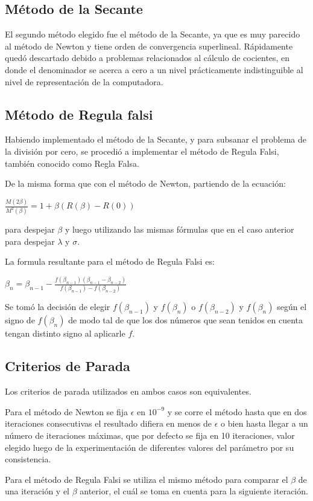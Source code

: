 \subsection{M\'etodo de la Secante}

El segundo m\'etodo elegido fue el m\'etodo de la Secante, ya que es muy parecido al m\'etodo de Newton y tiene orden 
de convergencia superlineal. R\'apidamente qued\'o descartado debido a problemas relacionados al c\'alculo de 
cocientes, en donde el denominador se acerca a cero a un nivel pr\'acticamente indistinguible al nivel de 
representaci\'on de la computadora.

\subsection{M\'etodo de Regula falsi}

Habiendo implementado el m\'etodo de la Secante, y para subsanar el problema de la divisi\'on por cero, se 
procedi\'o a implementar el m\'etodo de Regula Falsi, tambi\'en conocido como Regla Falsa.

De la misma forma que con el m\'etodo de Newton, partiendo de la ecuaci\'on:

$\frac{M(2\beta)}{M^2(\beta)}=1 + \beta(R(\beta)-R(0))$

para despejar $\beta$ y luego utilizando las mismas f\'ormulas que en el caso anterior para despejar $\lambda$ y 
$\sigma$.

La formula resultante para el m\'etodo de Regula Falsi es:

$\beta_n = \beta_{n-1} - \frac{f(\beta_{n-1}) (\beta_{n-1}-\beta_{n-2})}{f(\beta_{n-1}) - f(\beta_{n-2})}$

Se tom\'o la decisi\'on de elegir $f(\beta_{n-1})$ y $f(\beta_n)$ o $f(\beta_{n-2})$ y $f(\beta_n)$ seg\'un el 
signo de $f(\beta_n)$ de modo tal de que los dos n\'umeros que sean tenidos en cuenta tengan distinto signo al 
aplicarle $f$.

\subsection{Criterios de Parada}

Los criterios de parada utilizados en ambos casos son equivalentes.

Para el m\'etodo de Newton se fija $\epsilon$ en $10^{-9}$ y se corre el m\'etodo hasta que en dos iteraciones 
consecutivas el resultado difiera en menos de $\epsilon$ o bien hasta llegar a un n\'umero de iteraciones m\'aximas, 
que por defecto se fija en 10 iteraciones, valor elegido luego de la experimentaci\'on de diferentes valores del 
par\'ametro por su consistencia.

Para el m\'etodo de Regula Falsi se utiliza el mismo m\'etodo para comparar el $\beta$ de una iteraci\'on y el 
$\beta$ anterior, el cu\'al se toma en cuenta para la siguiente iteraci\'on.
